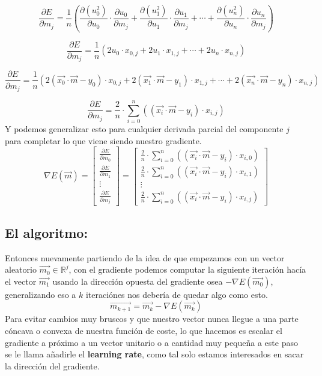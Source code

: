 \documentclass[12pt, letterpaper]{article}
\begin{document}
 \[
  \frac{\partial E}{\partial m_j}
  = \frac{1}{n}(\frac{\partial (u_0^2)}{\partial u_0} \cdot \frac{\partial u_0}{\partial m_j}
  + \frac{\partial (u_1^2)}{\partial u_1} \cdot \frac{\partial u_1}{\partial m_j}
  + \cdots
   + \frac{\partial (u_n^2)}{\partial u_n} \cdot \frac{\partial u_n}{\partial m_j})
 \]

 \[
  \frac{\partial E}{\partial m_j}
  = \frac{1}{n}(2u_0 \cdot x_{0,j}
  + 2u_1 \cdot x_{1, j}
  + \cdots
   + 2u_n \cdot x_{n, j})
 \]

 \[
  \frac{\partial E}{\partial m_j}
  = \frac{1}{n}(2(\vec{x_0} \cdot \vec{m} - y_0) \cdot x_{0,j} 
  + 2(\vec{x_1} \cdot \vec{m} - y_1) \cdot x_{1, j}
  + \cdots
   + 2(\vec{x_n} \cdot \vec{m} - y_n) \cdot x_{n, j})
 \]

  \[
  \frac{\partial E}{\partial m_j}
  = \frac{2}{n} \cdot \sum_{i = 0}^{n}((\vec{x_i} \cdot \vec{m} - y_i) \cdot x_{i, j})
\]
Y podemos generalizar esto para cualquier derivada parcial del componente $j$ para completar lo que viene
siendo nuestro gradiente.
\[
  \nabla E(\vec{m}) = \begin{bmatrix}
                        \frac{\partial E}{\partial m_0} \\
                        \frac{\partial E}{\partial m_1} \\
                        \vdots \\
                        \frac{\partial E}{\partial m_j}
                      \end{bmatrix} =
                      \begin{bmatrix}
                        \frac{2}{n} \cdot \sum_{i = 0}^n((\vec{x_i} \cdot \vec{m} - y_i) \cdot  x_{i, 0}) \\
                        \frac{2}{n} \cdot \sum_{i = 0}^n((\vec{x_i} \cdot \vec{m} - y_i) \cdot x_{i, 1}) \\
                        \vdots \\
                        \frac{2}{n} \cdot \sum_{i = 0}^n((\vec{x_i} \cdot \vec{m} - y_i) \cdot x_{i, j})
                      \end{bmatrix}
                    \]
\subsection{El algoritmo:}
Entonces nuevamente partiendo de la idea de que empezamos con un vector aleatorio $\vec{m_0} \in \mathbb{R}^j$,
con el gradiente podemos computar la siguiente iteración hacía el vector $\vec{m_1}$ usando la dirección
opuesta del gradiente osea $- \nabla E(\vec{m_0})$, generalizando eso a $k$ iteraciónes nos debería de
quedar algo como esto.
\[
  \vec{m_{k+1}} = \vec{m_k} - \nabla E(\vec{m_k})
\]
Para evitar cambios muy bruscos y que nuestro vector nunca llegue a una parte cóncava o convexa de nuestra
función de coste, lo que hacemos es escalar el gradiente a próximo a un vector unitario o a cantidad
muy pequeña a este paso se le llama añadirle el \textbf{learning rate}, como tal solo estamos interesados
en sacar la dirección del gradiente.
\end{document}
